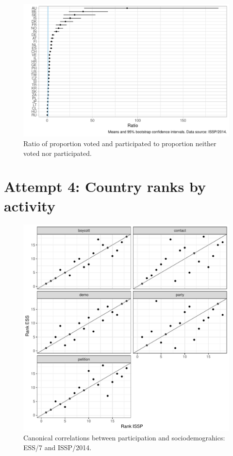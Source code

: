 \documentclass[12pt,]{article}
\begin{document}
\begin{figure}[H]

{\centering \includegraphics{report_files/figure-latex/issp-ratio-all-1} 

}

\caption{Ratio of proportion voted and participated to proportion neither voted nor participated.}\label{fig:issp-ratio-all}
\end{figure}

\hypertarget{attempt-4-country-ranks-by-activity}{%
\section{Attempt 4: Country ranks by activity}\label{attempt-4-country-ranks-by-activity}}

\begin{figure}[H]

{\centering \includegraphics{report_files/figure-latex/cntry-ranks-1} 

}

\caption{Canonical correlations between participation and sociodemograhics: ESS/7 and ISSP/2014.}\label{fig:cntry-ranks}
\end{figure}
\end{document}
